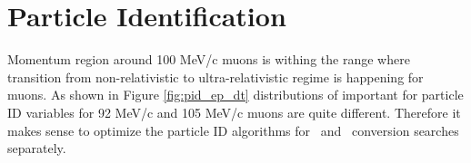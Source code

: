 

\section{Particle Identification}

Momentum region around 100 MeV/c muons is withing the range where transition from non-relativistic
to ultra-relativistic regime is happening for muons. As shown in Figure \ref{fig:pid_ep_dt}
distributions of important for particle ID variables for 92 MeV/c and 105 MeV/c muons are quite
different. Therefore it makes sense to optimize the particle ID algorithms for \MuToEm\ and \MuToEp\ 
conversion searches separately.

